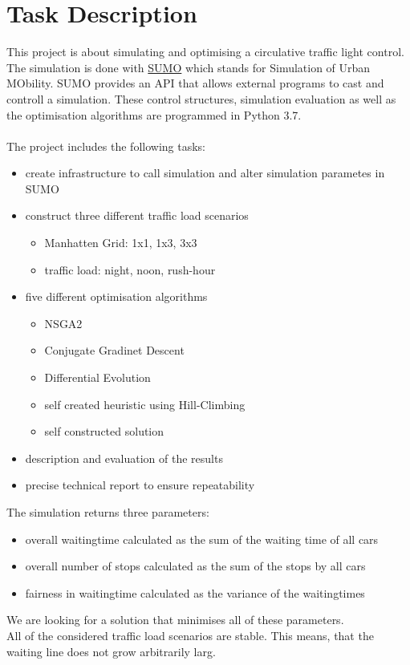 \documentclass[./\jobname.tex]{subfiles}
\begin{document}
\chapter{Task Description}

This project is about simulating and optimising a circulative traffic light control. The simulation is done with  \href{https://www.dlr.de/ts/en/desktopdefault.aspx/tabid-9883/16931_read-41000/}{SUMO} which stands for Simulation of Urban MObility. SUMO provides an API that allows external programs to cast and controll a simulation. These control structures, simulation evaluation as well as the optimisation algorithms are programmed in Python 3.7. \\~\\
The project includes the following tasks: 
\begin{itemize}
	\item create infrastructure to call simulation and alter simulation parametes in SUMO
	\item construct three different traffic load scenarios
	\begin{itemize}
		\item Manhatten Grid: 1x1, 1x3, 3x3
		\item traffic load: night, noon, rush-hour
	\end{itemize}
	\item five different optimisation algorithms
	\begin{itemize}
		\item NSGA2
		\item Conjugate Gradinet Descent
		\item Differential Evolution
		\item self created heuristic using Hill-Climbing
		\item self constructed solution
	\end{itemize}
	\item description and evaluation of the results
	\item precise technical report to ensure repeatability 
\end{itemize}

The simulation returns three parameters: 
\begin{itemize}
	\item overall waitingtime calculated as the sum of the waiting time of all cars
	\item overall number of stops calculated as the sum of the stops by all cars
	\item fairness in waitingtime calculated as the variance of the waitingtimes \\
\end{itemize}
We are looking for a solution that minimises all of these parameters. \\
All of the considered traffic load scenarios are stable. This means, that the waiting line does not grow arbitrarily larg. 
\end{document}
